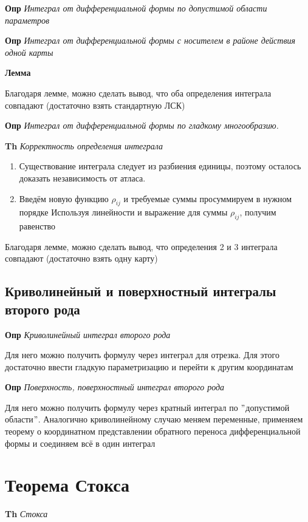 \documentclass[a4paper, 14pt]{article}
\begin{document}
    \textbf{Опр} \textit{Интеграл от дифференциальной формы по допустимой области параметров}
    
    \textbf{Опр} \textit{Интеграл от дифференциальной формы с носителем в районе действия одной карты}
    
    \textbf{Лемма}
    
    Благодаря лемме, можно сделать вывод, что оба определения интеграла совпадают (достаточно взять стандартную ЛСК)
    
    \textbf{Опр} \textit{Интеграл от дифференциальной формы по гладкому многообразию.}
    
    \textbf{Th} \textit{Корректность определения интеграла}
    
    \begin{enumerate}
        \item Существование интеграла следует из разбиения единицы, поэтому осталось доказать независимость от атласа.
        \item Введём новую функцию $\rho_{ij}$ и требуемые суммы просуммируем в нужном порядке
        Используя линейности и выражение для суммы $\rho_{ij}$, получим равенство
    \end{enumerate}
    
    Благодаря лемме, можно сделать вывод, что определения 2 и 3 интеграла совпадают (достаточно взять одну карту)
    
    \subsection{Криволинейный и поверхностный интегралы второго рода}
    
    \textbf{Опр} \textit{Криволинейный интеграл второго рода}
    
    Для него можно получить формулу через интеграл для отрезка.
    Для этого достаточно ввести гладкую параметризацию и перейти к другим координатам
    
    \textbf{Опр} \textit{Поверхность, поверхностный интеграл второго рода}
    
    Для него можно получить формулу через кратный интеграл по \("\)допустимой области\("\).
    Аналогично криволинейному случаю меняем переменные, применяем теорему о координатном представлении обратного
    переноса дифференциальной формы и соединяем всё в один интеграл
    
    \section{Теорема Стокса}
    
    \textbf{Th} \textit{Стокса}
\end{document}
